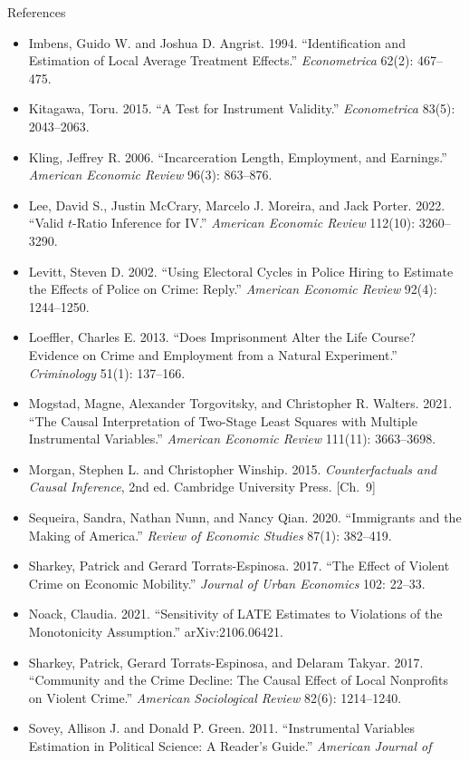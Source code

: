 \documentclass[aspectratio=169,11pt,xcolor=dvipsnames]{beamer}
\begin{document}
\begin{frame}[allowframebreaks,t]{References}
\begin{itemize}
\item Imbens, Guido W. and Joshua D. Angrist. 1994. ``Identification and
Estimation of Local Average Treatment Effects.'' \textit{Econometrica} 62(2):
467--475.
\item Kitagawa, Toru. 2015. ``A Test for Instrument Validity.'' \textit{Econometrica} 83(5): 2043--2063.
\item Kling, Jeffrey R. 2006. ``Incarceration Length, Employment, and Earnings.'' \textit{American Economic Review} 96(3): 863--876.
\item Lee, David S., Justin McCrary, Marcelo J. Moreira, and Jack Porter. 2022.
``Valid $t$-Ratio Inference for IV.'' \textit{American Economic Review} 112(10):
3260--3290.
\item Levitt, Steven D. 2002. ``Using Electoral Cycles in Police Hiring to Estimate the Effects of Police on Crime: Reply.'' \textit{American Economic Review} 92(4): 1244--1250.
\item Loeffler, Charles E. 2013. ``Does Imprisonment Alter the Life Course? Evidence on Crime and Employment from a Natural Experiment.'' \textit{Criminology} 51(1): 137--166.
\item Mogstad, Magne, Alexander Torgovitsky, and Christopher R. Walters. 2021. ``The Causal Interpretation of Two-Stage Least Squares with Multiple Instrumental Variables.'' \textit{American Economic Review} 111(11): 3663--3698.
\item Morgan, Stephen L. and Christopher Winship. 2015.
\textit{Counterfactuals and Causal Inference}, 2nd ed. Cambridge University
Press. [Ch.\ 9]
\item Sequeira, Sandra, Nathan Nunn, and Nancy Qian. 2020. ``Immigrants and the Making of America.'' \textit{Review of Economic Studies} 87(1): 382--419.
\item Sharkey, Patrick and Gerard Torrats-Espinosa. 2017. ``The Effect of Violent Crime on Economic Mobility.'' \textit{Journal of Urban Economics} 102: 22--33.
\item Noack, Claudia. 2021. ``Sensitivity of LATE Estimates to Violations of the Monotonicity Assumption.'' arXiv:2106.06421.
\item Sharkey, Patrick, Gerard Torrats-Espinosa, and Delaram Takyar. 2017. ``Community and the Crime Decline: The Causal Effect of Local Nonprofits on Violent Crime.'' \textit{American Sociological Review} 82(6): 1214--1240.
\item Sovey, Allison J. and Donald P. Green. 2011. ``Instrumental Variables
Estimation in Political Science: A Reader's Guide.'' \textit{American Journal of
}
\end{itemize}
\end{frame}
\end{document}

